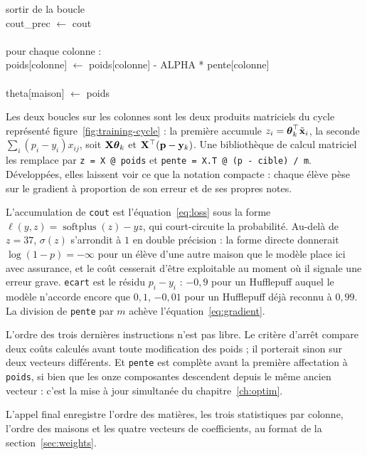 \begin{pseudo}
\hspace*{6em}sortir de la boucle\\
\hspace*{4em}cout\_prec $\leftarrow$ cout\\
\\
\hspace*{4em}pour chaque colonne :\\
\hspace*{6em}poids[colonne] $\leftarrow$ poids[colonne] - ALPHA * pente[colonne]\\
\\
\hspace*{2em}theta[maison] $\leftarrow$ poids
\end{pseudo}

Les deux boucles sur les colonnes sont les deux produits matriciels du cycle
représenté figure~\ref{fig:training-cycle} : la première accumule
$z_i=\boldsymbol{\theta}_k^\top\tilde{\mathbf{x}}_i$, la seconde $\sum_i(p_i-y_i)x_{ij}$, soit $\mathbf{X}\boldsymbol{\theta}_k$ et
$\mathbf{X}^\top(\mathbf p-\mathbf{y}_k)$. Une bibliothèque de calcul matriciel les remplace par
\texttt{z = X @ poids} et \texttt{pente = X.T @ (p - cible) / m}. Développées,
elles laissent voir ce que la notation compacte : chaque élève pèse sur le
gradient à proportion de son erreur et de ses propres notes.

L'accumulation de \texttt{cout} est l'équation~\eqref{eq:loss} sous la forme
$\ell(y,z)=\operatorname{softplus}(z)-yz$, qui court-circuite la probabilité.
Au-delà de $z=37$, $\sigma(z)$ s'arrondit à $1$ en double précision : la forme
directe donnerait $\log(1-p)=-\infty$ pour un élève d'une autre maison que le
modèle place ici avec assurance, et le coût cesserait d'être exploitable au
moment où il signale une erreur grave. \texttt{ecart} est le résidu $p_i-y_i$ :
$-0{,}9$ pour un Hufflepuff auquel le modèle n'accorde encore que $0{,}1$,
$-0{,}01$ pour un Hufflepuff déjà reconnu à $0{,}99$. La division de
\texttt{pente} par $m$ achève l'équation~\eqref{eq:gradient}.

L'ordre des trois dernières instructions n'est pas libre. Le critère d'arrêt
compare deux coûts calculés avant toute modification des poids ; il porterait
sinon sur deux vecteurs différents. Et \texttt{pente} est complète avant la
première affectation à \texttt{poids}, si bien que les onze composantes
descendent depuis le même ancien vecteur : c'est la mise à jour simultanée du
chapitre~\ref{ch:optim}.

L'appel final enregistre l'ordre des matières, les trois statistiques par
colonne, l'ordre des maisons et les quatre vecteurs de coefficients, au format
de la section~\ref{sec:weights}.

